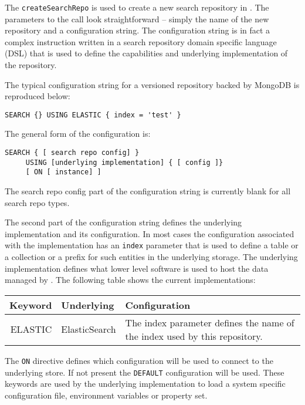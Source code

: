 The \verb+createSearchRepo+ is used to create a new search repository in \Rapture. The parameters to the call
look straightforward -- simply the name of the new repository and a configuration string. The configuration string is
in fact a complex instruction written in a search repository domain specific language (DSL) that is used to define the
capabilities and underlying implementation of the repository.

The typical configuration string for a versioned repository backed by MongoDB is reproduced below:

\begin{Verbatim}
SEARCH {} USING ELASTIC { index = 'test' }
\end{Verbatim}

The general form of the configuration is:

\begin{Verbatim}
SEARCH { [ search repo config] }
     USING [underlying implementation] { [ config ]}
     [ ON [ instance] ]
\end{Verbatim}

The search repo config part of the configuration string is currently blank for all search repo types.

The second part of the configuration string defines the underlying implementation and its configuration. In
most cases the configuration associated with the implementation has an \verb+index+ parameter that is used to
define a table or a collection or a prefix for such entities in the underlying storage. The underlying implementation
defines what lower level software is used to host the data managed by \Rapture. The following table shows the current
implementations:

\begin{table}[H]
\small
\begin{center}
\begin{tabular}{r l p{8cm}}
  Keyword & Underlying & Configuration \\
  \hline
  ELASTIC & ElasticSearch & The index parameter defines the name of the index used by this repository. \\
\end{tabular}
\end{center}
\end{table}

The \verb+ON+ directive defines which configuration will be used to connect to the underlying store. If
not present the \verb+DEFAULT+ configuration will be used. These keywords are used by the underlying
implementation to load a system specific configuration file, environment variables or property set.

